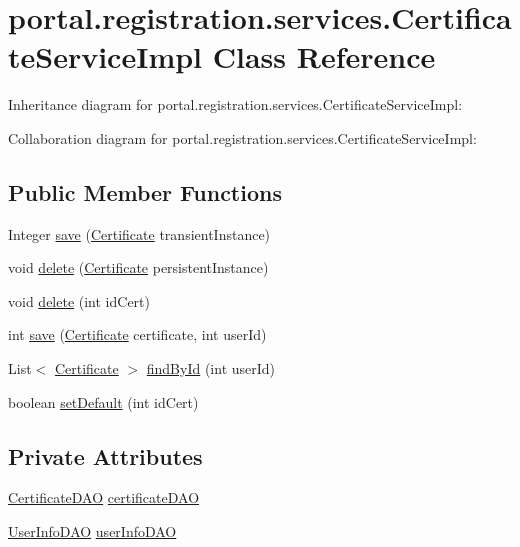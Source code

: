 \hypertarget{classportal_1_1registration_1_1services_1_1CertificateServiceImpl}{
\section{portal.registration.services.CertificateServiceImpl Class Reference}
\label{classportal_1_1registration_1_1services_1_1CertificateServiceImpl}
}


Inheritance diagram for portal.registration.services.CertificateServiceImpl:


Collaboration diagram for portal.registration.services.CertificateServiceImpl:
\subsection*{Public Member Functions}
\begin{DoxyCompactItemize}
\item 
Integer \hyperlink{classportal_1_1registration_1_1services_1_1CertificateServiceImpl_a50956067a79a48c6957e422c33b73f56}{save} (\hyperlink{classportal_1_1registration_1_1domain_1_1Certificate}{Certificate} transientInstance)
\item 
void \hyperlink{classportal_1_1registration_1_1services_1_1CertificateServiceImpl_a304c2968bab9d2c97a7aa10863c8dd48}{delete} (\hyperlink{classportal_1_1registration_1_1domain_1_1Certificate}{Certificate} persistentInstance)
\item 
void \hyperlink{classportal_1_1registration_1_1services_1_1CertificateServiceImpl_a8c82de27eb589083a94bd6c34bde7247}{delete} (int idCert)
\item 
int \hyperlink{classportal_1_1registration_1_1services_1_1CertificateServiceImpl_a592df743c12b9a43db06dbae92db23c2}{save} (\hyperlink{classportal_1_1registration_1_1domain_1_1Certificate}{Certificate} certificate, int userId)
\item 
List$<$ \hyperlink{classportal_1_1registration_1_1domain_1_1Certificate}{Certificate} $>$ \hyperlink{classportal_1_1registration_1_1services_1_1CertificateServiceImpl_aa262a9afdd7f565552e4f6b273a97c8c}{findById} (int userId)
\item 
boolean \hyperlink{classportal_1_1registration_1_1services_1_1CertificateServiceImpl_abac3e70bf6b1f63ca1d96e0829365f5c}{setDefault} (int idCert)
\end{DoxyCompactItemize}
\subsection*{Private Attributes}
\begin{DoxyCompactItemize}
\item 
\hyperlink{interfaceportal_1_1registration_1_1dao_1_1CertificateDAO}{CertificateDAO} \hyperlink{classportal_1_1registration_1_1services_1_1CertificateServiceImpl_a427333bd7f98ef4e0a577c9aad7f8b37}{certificateDAO}
\item 
\hyperlink{interfaceportal_1_1registration_1_1dao_1_1UserInfoDAO}{UserInfoDAO} \hyperlink{classportal_1_1registration_1_1services_1_1CertificateServiceImpl_aceeb91e757fb23300d5f1e6444ab1534}{userInfoDAO}
\end{DoxyCompactItemize}
